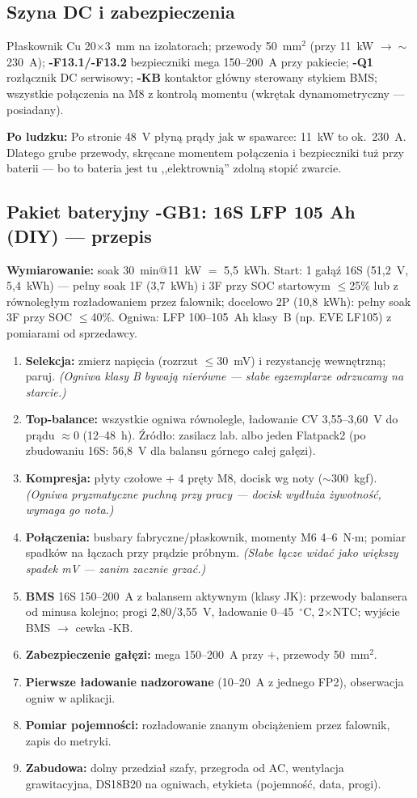 \documentclass[11pt,a4paper]{article}
\newcommand{\why}[1]{\par\smallskip\noindent\colorbox{blue!6}{\parbox{0.965\linewidth}{\small\textbf{Po ludzku:} #1}}\par\smallskip}
\begin{document}
\subsection{Szyna DC i zabezpieczenia}
Płaskownik Cu 20$\times$3~mm na izolatorach; przewody 50~mm$^2$ (przy 11~kW $\to\sim$230~A);
\textbf{-F13.1/-F13.2} bezpieczniki mega 150--200~A przy pakiecie; \textbf{-Q1} rozłącznik DC
serwisowy; \textbf{-KB} kontaktor główny sterowany stykiem BMS; wszystkie połączenia na M8
z kontrolą momentu (wkrętak dynamometryczny --- posiadany).
\why{Po stronie 48~V płyną prądy jak w spawarce: 11~kW to ok.~230~A. Dlatego grube przewody,
skręcane momentem połączenia i bezpieczniki tuż przy baterii --- bo to bateria jest tu
,,elektrownią'' zdolną stopić zwarcie.}
\subsection{Pakiet bateryjny -GB1: 16S LFP 105 Ah (DIY) --- przepis}
\label{sec:pakiet}
\textbf{Wymiarowanie:} soak 30~min@11~kW $=$ 5,5~kWh. Start: 1 gałąź 16S (51,2~V, 5,4~kWh) ---
pełny soak 1F (3,7~kWh) i 3F przy SOC startowym $\le$25\% lub z równoległym rozładowaniem przez
falownik; docelowo 2P (10,8~kWh): pełny soak 3F przy SOC $\le$40\%. Ogniwa: LFP 100--105~Ah
klasy~B (np. EVE LF105) z pomiarami od sprzedawcy.
\begin{enumerate}
\item \textbf{Selekcja:} zmierz napięcia (rozrzut $\le$30~mV) i rezystancję wewnętrzną; paruj.
\emph{(Ogniwa klasy B bywają nierówne --- słabe egzemplarze odrzucamy na starcie.)}
\item \textbf{Top-balance:} wszystkie ogniwa równolegle, ładowanie CV 3,55--3,60~V do prądu
$\approx$0 (12--48~h). Źródło: zasilacz lab. albo jeden Flatpack2 (po zbudowaniu 16S: 56,8~V
dla balansu górnego całej gałęzi).
\item \textbf{Kompresja:} płyty czołowe + 4 pręty M8, docisk wg noty ($\sim$300~kgf).
\emph{(Ogniwa pryzmatyczne puchną przy pracy --- docisk wydłuża żywotność, wymaga go nota.)}
\item \textbf{Połączenia:} busbary fabryczne/płaskownik, momenty M6 4--6~N$\cdot$m; pomiar spadków
na łączach przy prądzie próbnym. \emph{(Słabe łącze widać jako większy spadek mV --- zanim
zacznie grzać.)}
\item \textbf{BMS} 16S 150--200~A z balansem aktywnym (klasy JK): przewody balansera od minusa
kolejno; progi 2,80/3,55~V, ładowanie 0--45~$^\circ$C, 2$\times$NTC; wyjście BMS $\to$ cewka -KB.
\item \textbf{Zabezpieczenie gałęzi:} mega 150--200~A przy $+$, przewody 50~mm$^2$.
\item \textbf{Pierwsze ładowanie nadzorowane} (10--20~A z jednego FP2), obserwacja ogniw w aplikacji.
\item \textbf{Pomiar pojemności:} rozładowanie znanym obciążeniem przez falownik, zapis do metryki.
\item \textbf{Zabudowa:} dolny przedział szafy, przegroda od AC, wentylacja grawitacyjna, DS18B20
na ogniwach, etykieta (pojemność, data, progi).
\end{enumerate}
\end{document}
